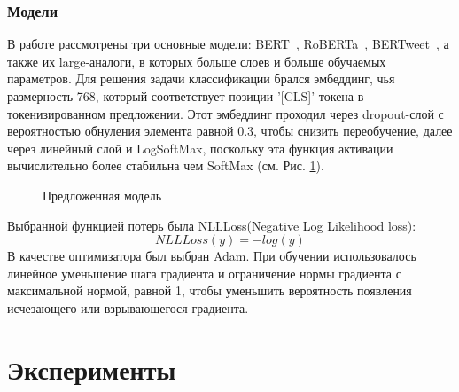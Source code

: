 \documentclass{article}
\begin{document}
\subsubsection{Модели}
В работе рассмотрены три основные модели: BERT~\cite{devlin}, RoBERTa~\cite{roberta}, BERTweet~\cite{bertweet}, а также их large-аналоги, в которых больше слоев и больше обучаемых параметров. Для решения задачи классификации брался  эмбеддинг, чья размерность 768, который соответствует позиции '[CLS]' токена в токенизированном предложении. Этот эмбеддинг проходил через dropout-слой с вероятностью обнуления элемента равной 0.3, чтобы снизить переобучение, далее через линейный слой и LogSoftMax, поскольку эта функция активации вычислительно более стабильна чем SoftMax (см. Рис. \ref{eq:proposed_model}).
\begin{figure}[h!]
    \caption{\centering Предложенная модель}
	\label{eq:proposed_model}
\end{figure}
Выбранной функцией потерь была NLLLoss(Negative Log Likelihood loss):
$$
NLLLoss(y) = - log(y)
$$
В качестве оптимизатора был выбран Adam. При обучении использовалось линейное уменьшение шага градиента и  ограничение нормы градиента с максимальной нормой, равной 1, чтобы уменьшить вероятность появления исчезающего или взрывающегося градиента.

\section{Эксперименты}
\end{document}
